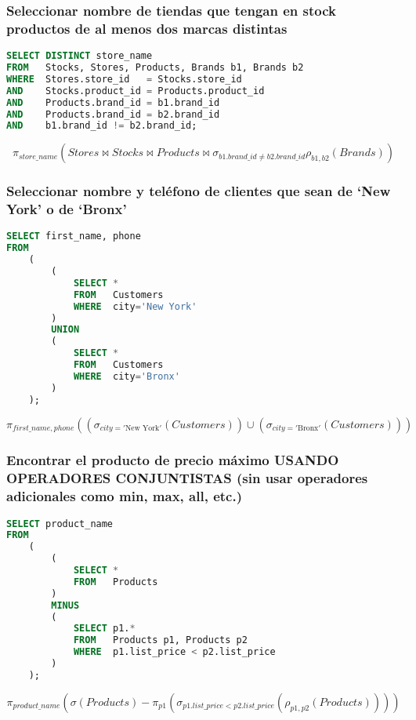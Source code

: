 \subsubsection{Seleccionar nombre de tiendas que tengan en stock productos de al menos dos marcas distintas}

\begin{lstlisting}[language=SQL]
SELECT DISTINCT store_name
FROM   Stocks, Stores, Products, Brands b1, Brands b2
WHERE  Stores.store_id   = Stocks.store_id
AND    Stocks.product_id = Products.product_id
AND    Products.brand_id = b1.brand_id
AND    Products.brand_id = b2.brand_id
AND    b1.brand_id != b2.brand_id;
\end{lstlisting}

\[\pi_{store\_name}(Stores\bowtie Stocks\bowtie Products\bowtie\sigma_{b1.brand\_id\neq b2.brand\_id}\rho_{b1,b2}(Brands))\]

\subsubsection{Seleccionar nombre y teléfono de clientes que sean de `New York' o de `Bronx'}

\begin{lstlisting}[language=SQL]
SELECT first_name, phone
FROM
	(
		(
			SELECT *
			FROM   Customers
			WHERE  city='New York'
		)
		UNION
		(
			SELECT *
			FROM   Customers
			WHERE  city='Bronx'
		)
	);
\end{lstlisting}

\[\pi_{first\_name,phone}((\sigma_{city='\text{New York}'}(Customers))\cup(\sigma_{city='\text{Bronx}'}(Customers)))\]

\pagebreak

\subsubsection{Encontrar el producto de precio máximo USANDO OPERADORES CONJUNTISTAS (sin usar operadores adicionales como min, max, all, etc.)}

\begin{lstlisting}[language=SQL]
SELECT product_name
FROM
	(
		(
			SELECT *
			FROM   Products
		)
		MINUS
		(
			SELECT p1.*
			FROM   Products p1, Products p2
			WHERE  p1.list_price < p2.list_price
		)
	);
\end{lstlisting}

\[\pi_{product\_name}(\sigma(Products)-\pi_{p1}(\sigma_{p1.list\_price<p2.list\_price}(\rho_{p1,p2}(Products))))\]

